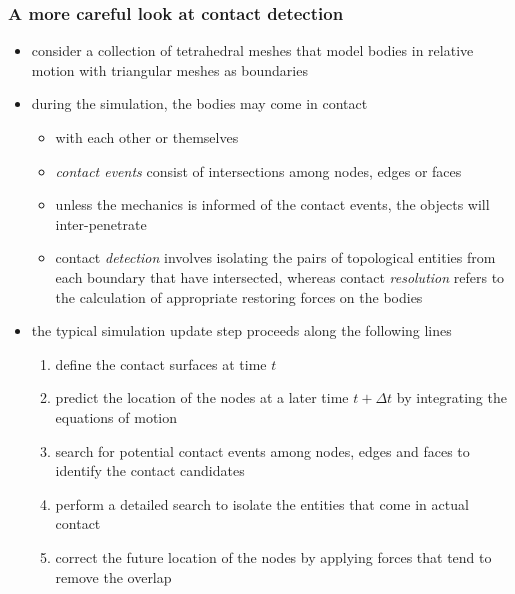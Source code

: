 %
%
%
%


\begin{frame}[fragile]
%
  \frametitle{A more careful look at contact detection}
%
  \begin{itemize}
%
  \item consider a collection of tetrahedral meshes that model bodies in relative motion with
    triangular meshes as boundaries
%
  \item during the simulation, the bodies may come in contact
    \begin{itemize}
    \item with each other or themselves
    \item {\em contact events} consist of intersections among nodes, edges or faces
    \item unless the mechanics is informed of the contact events, the objects will
      inter-penetrate
    \item contact {\em detection} involves isolating the pairs of topological entities from
      each boundary that have intersected, whereas contact {\em resolution} refers to the
      calculation of appropriate restoring forces on the bodies
    \end{itemize}
%
  \item the typical simulation update step proceeds along the following lines
    \begin{enumerate}
    \item define the contact surfaces at time $t$
    \item predict the location of the nodes at a later time $t+\Delta t$ by integrating the
      equations of motion
    \item search for potential contact events among nodes, edges and faces to identify the
      contact candidates \label{item:contact-crude}
    \item perform a detailed search to isolate the entities that come in actual
      contact \label{item:contact-detailed}
    \item correct the future location of the nodes by applying forces that tend to remove the
      overlap
    \end{enumerate}
%
  \end{itemize}
%
\end{frame}

